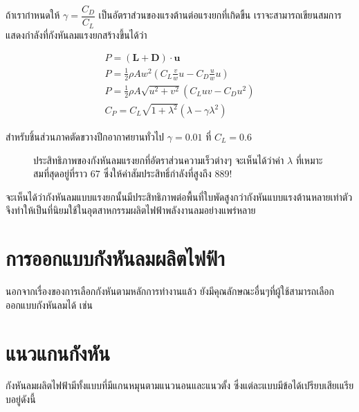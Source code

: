 \documentclass[a4paper,nobib,openany,10pt]{tufte-book}
\begin{document}
ถ้าเรากำหนดให้ \(\gamma = \dfrac{C_D}{C_L}\)
เป็นอัตราส่วนของแรงต้านต่อแรงยกที่เกิดขึ้น
เราจะสามารถเขียนสมการแสดงกำลังที่กังหันลมแรงยกสร้างขึ้นได้ว่า

\[\begin{gathered}
  P = (\mathbf{L} + \mathbf{D}) \cdot \mathbf{u} \nonumber \\
  P = \frac{1}{2}\rho A w^2 (C_L \frac{v}{w} u - C_D \frac{u}{w}u) \nonumber \\
  P = \frac{1}{2}\rho A \sqrt{u^2 + v^2} \left( C_L u v - C_D u^2 \right) \nonumber \\
  C_P = C_L \sqrt{1+\lambda^2} \left( \lambda - \gamma \lambda^2 \right) \end{gathered}\]

สำหรับชิ้นส่วนภาคตัดขวางปีกอากาศยานทั่วไป \(\gamma =  0.01\) ที่
\(C_L = 0.6\)

\begin{figure}[h]
\caption{\label{fig:power coeff lift-based turbine}ประสิทธิภาพของกังหันลมแรงยกที่อัตราส่วนความเร็วต่างๆ จะเห็นได้ว่าค่า \(\lambda\) ที่เหมาะสมที่สุดอยู่ที่ราว 67 ซึ่งให้ค่าสัมประสิทธิ์กำลังที่สูงถึง 889!}
\end{figure}

จะเห็นได้ว่ากังหันลมแบบแรงยกนั้นมีประสิทธิภาพต่อพื้นที่ใบพัดสูงกว่ากังหันแบบแรงต้านหลายเท่าตัว
จึงทำให้เป็นที่นิยมใช้ในอุตสาหกรรมผลิตไฟฟ้าพลังงานลมอย่างแพร่หลาย

\section{การออกแบบกังหันลมผลิตไฟฟ้า}
\label{sec:org4efaefb}
นอกจากเรื่องของการเลือกกังหันตามหลักการทำงานแล้ว
ยังมีคุณลักษณะอื่นๆที่ผู้ใช้สามารถเลือกออกแบบกังหันลมได้ เช่น

\section{แนวแกนกังหัน}
\label{sec:org7a88cc1}
กังหันลมผลิตไฟฟ้ามีทั้งแบบที่มีแกนหมุนตามแนวนอนและแนวตั้ง
ซึ่งแต่ละแบบมีข้อได้เปรียบเสียเแรียบอยู่ดังนี้
\end{document}
